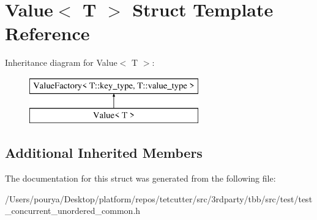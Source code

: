 \hypertarget{structValue}{}\section{Value$<$ T $>$ Struct Template Reference}
\label{structValue}
Inheritance diagram for Value$<$ T $>$\+:\begin{figure}[H]
\begin{center}
\leavevmode
\includegraphics[height=2.000000cm]{structValue}
\end{center}
\end{figure}
\subsection*{Additional Inherited Members}


The documentation for this struct was generated from the following file\+:\begin{DoxyCompactItemize}
\item 
/\+Users/pourya/\+Desktop/platform/repos/tetcutter/src/3rdparty/tbb/src/test/test\+\_\+concurrent\+\_\+unordered\+\_\+common.\+h\end{DoxyCompactItemize}
